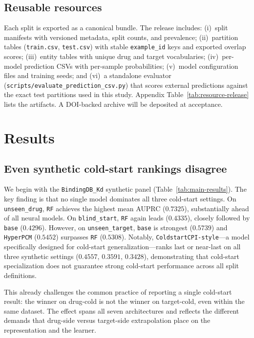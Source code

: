 \documentclass[referee,pdflatex,sn-basic,Numbered]{sn-jnl}
\newcommand{\AUPRC}{AUPRC}
\begin{document}
\subsection{Reusable resources}

Each split is exported as a canonical bundle. The release includes: (i)~split manifests with versioned metadata, split counts, and prevalence; (ii)~partition tables (\texttt{train.csv}, \texttt{test.csv}) with stable \texttt{example\_id} keys and exported overlap scores; (iii)~entity tables with unique drug and target vocabularies; (iv)~per-model prediction CSVs with per-sample probabilities; (v)~model configuration files and training seeds; and (vi)~a standalone evaluator (\texttt{scripts/evaluate\_prediction\_csv.py}) that scores external predictions against the exact test partitions used in this study. Appendix Table~\ref{tab:resource-release} lists the artifacts. A DOI-backed archive will be deposited at acceptance.

\section{Results}
\label{sec:results}

\subsection{Even synthetic cold-start rankings disagree}

We begin with the \texttt{BindingDB\_Kd} synthetic panel (Table~\ref{tab:main-results}). The key finding is that no single model dominates all three cold-start settings. On \texttt{unseen\_drug}, \texttt{RF} achieves the highest mean \AUPRC{} ($0.7325$), substantially ahead of all neural models. On \texttt{blind\_start}, \texttt{RF} again leads ($0.4335$), closely followed by \texttt{base} ($0.4296$). However, on \texttt{unseen\_target}, \texttt{base} is strongest ($0.5739$) and \texttt{HyperPCM} ($0.5452$) surpasses \texttt{RF} ($0.5308$). Notably, \texttt{ColdstartCPI-style}—a model specifically designed for cold-start generalization—ranks last or near-last on all three synthetic settings ($0.4557$, $0.3591$, $0.3428$), demonstrating that cold-start specialization does not guarantee strong cold-start performance across all split definitions.

This already challenges the common practice of reporting a single cold-start result: the winner on drug-cold is not the winner on target-cold, even within the same dataset. The effect spans all seven architectures and reflects the different demands that drug-side versus target-side extrapolation place on the representation and the learner.
\end{document}

